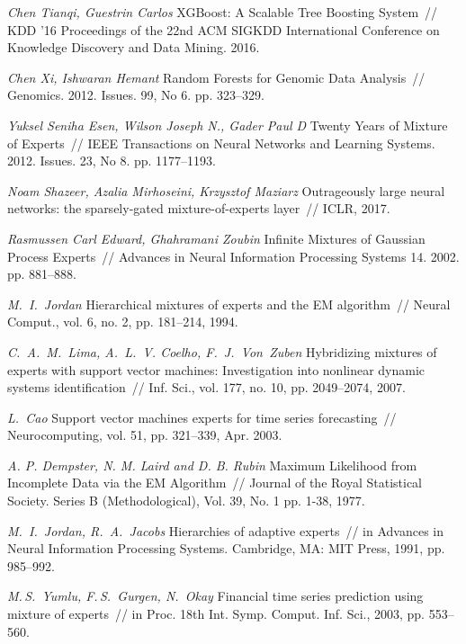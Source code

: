 \documentclass[12pt, twoside]{article}
\begin{document}
\begin{thebibliography}{99}
	\textit{Chen Tianqi, Guestrin Carlos} XGBoost: A Scalable Tree Boosting System~// KDD ’16 Proceedings of the 22nd ACM SIGKDD International Conference on Knowledge Discovery and Data Mining. 2016.
	
	\textit{Chen Xi, Ishwaran Hemant} Random Forests for Genomic Data Analysis~// Genomics. 2012. Issues. 99, No 6. pp. 323--329.

	\textit{Yuksel Seniha Esen, Wilson Joseph N., Gader Paul D} Twenty Years of Mixture of Experts~// IEEE Transactions on Neural Networks and Learning Systems. 2012. Issues. 23, No 8. pp. 1177--1193.

	\textit{Noam Shazeer, Azalia Mirhoseini, Krzysztof Maziarz} Outrageously large neural networks: the sparsely-gated mixture-of-experts layer~// ICLR, 2017.

	\textit{Rasmussen Carl Edward, Ghahramani Zoubin} Infinite Mixtures of Gaussian Process Experts~// Advances in Neural Information Processing Systems 14. 2002. pp. 881–888.
	
	\textit{M.~I.~Jordan} Hierarchical mixtures of experts and the EM algorithm~// Neural Comput., vol. 6, no. 2, pp. 181–214, 1994.
	
	\textit{C.~A.~M.~Lima, A.~L.~V. Coelho, F.~J.~Von~Zuben} Hybridizing mixtures of experts with support vector machines: Investigation into nonlinear dynamic systems identification~// Inf. Sci., vol. 177, no. 10, pp. 2049–2074, 2007.

	\textit{L.~Cao} Support vector machines experts for time series forecasting~// Neurocomputing, vol. 51, pp. 321–339, Apr. 2003.

	\textit{A. P. Dempster, N. M. Laird and D. B. Rubin} Maximum Likelihood from Incomplete Data via the EM Algorithm~// Journal of the Royal Statistical Society. Series B (Methodological), Vol. 39, No. 1 pp. 1-38, 1977.
	
	\textit{M.~I.~Jordan, R.~A.~Jacobs} Hierarchies of adaptive experts~// in Advances in Neural Information Processing Systems. Cambridge, MA: MIT Press, 1991, pp. 985–992.
	
	\textit{M.\,S.~Yumlu, F.\,S.~Gurgen,  N.~Okay} Financial time series prediction using mixture of experts~// in Proc. 18th Int. Symp. Comput. Inf. Sci., 2003, pp. 553--560.
	

\end{thebibliography}
\end{document}
